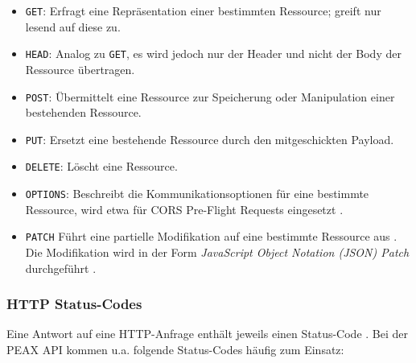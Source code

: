 \begin{itemize}
	\item \texttt{GET}: Erfragt eine Repräsentation einer bestimmten Ressource; greift nur lesend auf diese zu.
    \item \texttt{HEAD}: Analog zu \texttt{GET}, es wird jedoch nur der Header und nicht der Body der Ressource übertragen.
	\item \texttt{POST}: Übermittelt eine Ressource zur Speicherung oder Manipulation einer bestehenden Ressource.
	\item \texttt{PUT}: Ersetzt eine bestehende Ressource durch den mitgeschickten Payload.
	\item \texttt{DELETE}: Löscht eine Ressource.
    \item \texttt{OPTIONS}: Beschreibt die Kommunikationsoptionen für eine bestimmte Ressource, wird etwa für CORS Pre-Flight Requests eingesetzt \cite{mdn-cors}.
    \item \texttt{PATCH} Führt eine partielle Modifikation auf eine bestimmte Ressource aus \cite{RFC5789}. Die Modifikation wird in der Form \textit{JavaScript Object Notation (JSON) Patch} durchgeführt \cite{RFC6902}.
\end{itemize}

\subsubsection{HTTP Status-Codes}

Eine Antwort auf eine HTTP-Anfrage enthält jeweils einen Status-Code \cite[Abschnitt 6]{RFC7231}. Bei der PEAX API kommen u.a. folgende Status-Codes häufig zum Einsatz:

